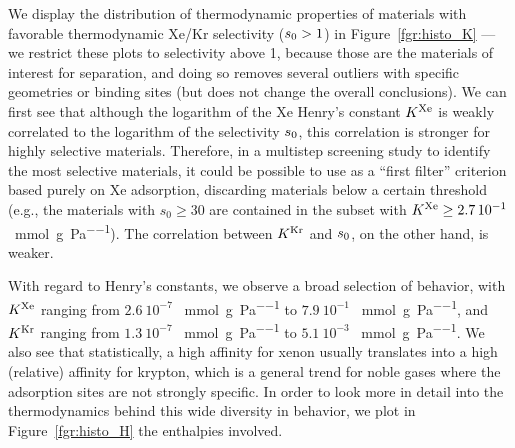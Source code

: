 \documentclass[main.tex]{subfiles}
\begin{document}
We display the distribution of thermodynamic properties of materials with favorable thermodynamic Xe/Kr selectivity ($s_{\text{0}} > 1$) in Figure~\ref{fgr:histo_K} --- we restrict these plots to selectivity above 1, because those are the materials of interest for separation, and doing so removes several outliers with specific geometries or binding sites (but does not change the overall conclusions). We can first see that although the logarithm of the Xe Henry's constant $K^{\text{Xe}}$ is weakly correlated to the logarithm of the selectivity $s_{\text{0}}$, this correlation is stronger for highly selective materials. Therefore, in a multistep screening study to identify the most selective materials, it could be possible to use as a ``first filter'' criterion based purely on Xe adsorption, discarding materials below a certain threshold (e.g., the materials with $s_0\ge30$ are contained in the subset with $K^{\text{Xe}}\ge2.7\,10^{-1}$~\si{\milli\mol\per\gram\per\pascal}). The correlation between $K^{\text{Kr}}$ and $s_{\text{0}}$, on the other hand, is weaker.

With regard to Henry's constants, we observe a broad selection of behavior, with $K^{\text{Xe}}$ ranging from $2.6\ 10^{-7}$ \SI{}{\milli\mol\per\gram\per\pascal} to $7.9\ 10^{-1}$ \SI{}{\milli\mol\per\gram\per\pascal}, and $K^{\text{Kr}}$ ranging from $1.3\ 10^{-7}$ \SI{}{\milli\mol\per\gram\per\pascal} to $5.1\ 10^{-3}$ \SI{}{\milli\mol\per\gram\per\pascal}. We also see that statistically, a high affinity for xenon usually translates into a high (relative) affinity for krypton, which is a general trend for noble gases where the adsorption sites are not strongly specific. In order to look more in detail into the thermodynamics behind this wide diversity in behavior, we plot in Figure~\ref{fgr:histo_H} the enthalpies involved.
\end{document}
